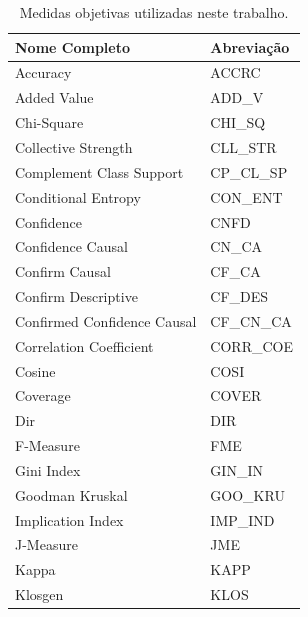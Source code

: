 \begin{table}[!htb]
\centering
\footnotesize
\caption{Medidas objetivas utilizadas neste trabalho.}
\label{tab:mos_abb}
\begin{tabular}{|l|l|}
\hline
\textbf{Nome Completo}         & \textbf{Abreviação} \\ \hline
Accuracy                       & ACCRC               \\ \hline
Added Value                    & ADD\_V              \\ \hline
Chi-Square                     & CHI\_SQ             \\ \hline
Collective Strength            & CLL\_STR            \\ \hline
Complement Class Support       & CP\_CL\_SP          \\ \hline
Conditional Entropy            & CON\_ENT            \\ \hline
Confidence                     & CNFD                \\ \hline
Confidence Causal              & CN\_CA              \\ \hline
Confirm Causal                 & CF\_CA              \\ \hline
Confirm Descriptive            & CF\_DES             \\ \hline
Confirmed Confidence Causal    & CF\_CN\_CA          \\ \hline
Correlation Coefficient        & CORR\_COE           \\ \hline
Cosine                         & COSI                \\ \hline
Coverage                       & COVER               \\ \hline
Dir                            & DIR                 \\ \hline
F-Measure                      & FME                 \\ \hline
Gini Index                     & GIN\_IN             \\ \hline
Goodman Kruskal                & GOO\_KRU            \\ \hline
Implication Index              & IMP\_IND            \\ \hline
J-Measure                      & JME                 \\ \hline
Kappa                          & KAPP                \\ \hline
Klosgen                        & KLOS                \\ \hline

\end{tabular}
\end{table}
